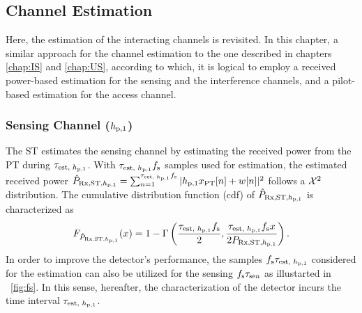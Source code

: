 \subsection{Channel Estimation}
Here, the estimation of the interacting channels is revisited. In this chapter, a similar approach for the channel estimation to the one described in chapters \ref{chap:IS} and \ref{chap:US}, according to which, it is logical to employ a received power-based estimation for the sensing and the interference channels, and a pilot-based estimation for the access channel.  
\subsubsection*{Sensing Channel ($h_{\text{p,1}}$)}
The ST estimates the sensing channel by estimating the received power from the PT during $\tau_{\text{est, $h_{\text{p,1}}$}}$. With $\tau_{\text{est, $h_{\text{p,1}}$}} f_{\text{s}}$ samples used for estimation, the estimated received power $\hat{P}_{\text{Rx,ST,$h_{\text{p,1}}$}} = \sum_{n = 1}^{\tau_{\text{est, $h_{\text{p,1}}$}} f_{\text{s}}} |h_{\text{p,1}} x_{\text{PT}}[n] + w[n]|^2$ follows a $\cchi2$ distribution.
The cumulative distribution function (cdf) of $\hat{P}_{\text{Rx,ST,$h_{\text{p,1}}$}}$ is characterized as
\begin{align}
F_{\hat{P}_{\text{Rx,ST,$h_{\text{p,1}}$}}}(x) = 1 - \Gamma \left( \frac{\tau_{\text{est, $h_{\text{p,1}}$}} f_{\text{s}}}{2}, \frac{\tau_{\text{est, $h_{\text{p,1}}$}} f_{\text{s}} x}{2 P_{\text{Rx,ST,$h_{\text{p,1}}$}}} \right) \label{eq:fprcvdstpt}.
\end{align}
In order to improve the detector's performance, the samples $f_{\text{s}} \tau_{\text{est, $h_{\text{p,1}}$}}$ considered for the estimation can also be utilized for the sensing $f_{\text{s}} \tau_{\text{sen}}$ as illustarted in \figurename~\ref{fig:fs}. In this sense, hereafter, the characterization of the detector incurs the time interval $\tau_{\text{est, $h_{\text{p,1}}$}}$. 
  
